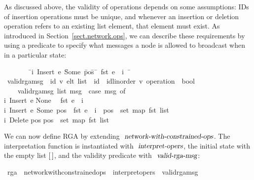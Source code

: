 As discussed above, the validity of operations depends on some assumptions: IDs of insertion operations must be unique, and whenever an insertion or deletion operation refers to an existing list element, that element must exist.
As introduced in Section~\ref{sect.network.ops}, we can describe these requirements by using a predicate to specify what messages a node is allowed to broadcast when in a particular state:
\begin{isabelle}
~~~~~~~~\={\isacharparenleft}i{\isacharcomma}\ Insert\ e\ {\isacharparenleft}\=Some\ \=pos{\isacharparenright}\={\isacharparenright}\ \={\isasymRightarrow}\ fst\ e\ {\isacharequal}\ i\ {\isasymand}\ \=\kill
{}\ valid{\isacharunderscore}rga{\isacharunderscore}msg\ {\isacharcolon}{\isacharcolon}\ {\isachardoublequoteopen}{\isacharparenleft}{\isacharprime}id{\isacharcomma}\ {\isacharprime}v{\isacharparenright}\ elt\ list\ {\isasymRightarrow}\ {\isacharprime}id\ {\isasymtimes}\ {\isacharparenleft}{\isacharprime}id{\isacharcolon}{\isacharcolon}linorder{\isacharcomma}\ {\isacharprime}v{\isacharparenright}\ operation\ {\isasymRightarrow}\ bool{\isachardoublequoteclose}\ \\
~~~~{\isachardoublequoteopen}valid{\isacharunderscore}rga{\isacharunderscore}msg\ list\ msg\ {\isasymequiv}\ case\ msg\ of\\
\>{\isacharparenleft}i{\isacharcomma}\ Insert\ e \>None \>\>{\isacharparenright}\ \>{\isasymRightarrow}\ fst\ e\ {\isacharequal}\ i\ {\isacharbar}\\
\>{\isacharparenleft}i{\isacharcomma}\ Insert\ e\ {\isacharparenleft}Some\ pos{\isacharparenright}{\isacharparenright}\ {\isasymRightarrow}\ fst\ e\ {\isacharequal}\ i\ {\isasymand}\ pos\ {\isasymin}\ set\ {\isacharparenleft}map\ fst\ list{\isacharparenright}\ {\isacharbar}\\
\>{\isacharparenleft}i{\isacharcomma}\ Delete \>\>pos \>{\isacharparenright} \>{\isasymRightarrow} \>pos\ {\isasymin}\ set\ {\isacharparenleft}map\ fst\ list{\isacharparenright}{\isachardoublequoteclose}
\end{isabelle}
We can now define RGA by extending $\isa{network-with-constrained-ops}$. The interpretation function is instantiated with $\isa{interpret-opers}$, the initial state with the empty list $\emph{$[$}\,\emph{$]$}$, and the validity predicate with $\isa{valid-rga-msg}$:
\begin{isabelle}
\ rga\ {\isacharequal}\ network{\isacharunderscore}with{\isacharunderscore}constrained{\isacharunderscore}ops\ {\isacharunderscore}\ interpret{\isacharunderscore}opers\ {\isachardoublequoteopen}{\isacharbrackleft}{\isacharbrackright}{\isachardoublequoteclose}\ valid{\isacharunderscore}rga{\isacharunderscore}msg
\end{isabelle}

